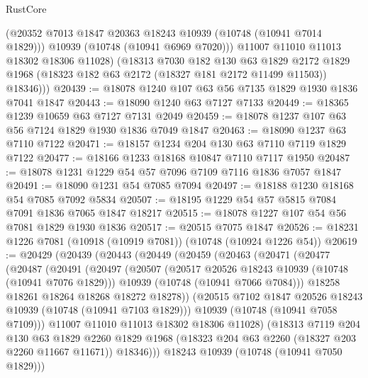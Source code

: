 \begin{lexlean}{RustCore}
\begin{coremodule}
            (@20352 @7013 @1847 @20363 @18243 @10939 (@10748 (@10941 @7014 @1829)))
            @10939
            (@10748 (@10941 @6969 @7020)))
          @11007
          @11010
          @11013
          @18302
          @18306
          @11028)
        (@18313
          @7030
          @182
          @130
          @63
          @1829
          @2172
          @1829
          @1968
          (@18323 @182 @63 @2172 (@18327 @181 @2172 @11499 @11503))
          @18346)))
@20439 := @18078 @1240 @107 @63 @56 @7135 @1829 @1930 @1836 @7041 @1847
@20443 := @18090 @1240 @63 @7127 @7133
@20449 := @18365 @1239 @10659 @63 @7127 @7131 @2049
@20459 := @18078 @1237 @107 @63 @56 @7124 @1829 @1930 @1836 @7049 @1847
@20463 := @18090 @1237 @63 @7110 @7122
@20471 := @18157 @1234 @204 @130 @63 @7110 @7119 @1829 @7122
@20477 := @18166 @1233 @18168 @10847 @7110 @7117 @1950
@20487 := @18078 @1231 @1229 @54 @57 @7096 @7109 @7116 @1836 @7057 @1847
@20491 := @18090 @1231 @54 @7085 @7094
@20497 := @18188 @1230 @18168 @54 @7085 @7092 @5834
@20507 := @18195 @1229 @54 @57 @5815 @7084 @7091 @1836 @7065 @1847 @18217
@20515 := @18078 @1227 @107 @54 @56 @7081 @1829 @1930 @1836
@20517 := @20515 @7075 @1847
@20526 := @18231 @1226 @7081 (@10918 (@10919 @7081)) (@10748 (@10924 @1226 @54))
@20619 := @20429
    (@20439
      (@20443
        (@20449
          (@20459
            (@20463
              (@20471
                (@20477
                  (@20487
                    (@20491
                      (@20497
                        (@20507
                          (@20517 @20526 @18243 @10939 (@10748 (@10941 @7076 @1829)))
                          @10939
                          (@10748 (@10941 @7066 @7084)))
                        @18258
                        @18261
                        @18264
                        @18268
                        @18272
                        @18278))
                    (@20515 @7102 @1847 @20526 @18243 @10939 (@10748 (@10941 @7103 @1829)))
                    @10939
                    (@10748 (@10941 @7058 @7109)))
                  @11007
                  @11010
                  @11013
                  @18302
                  @18306
                  @11028)
                (@18313
                  @7119
                  @204
                  @130
                  @63
                  @1829
                  @2260
                  @1829
                  @1968
                  (@18323 @204 @63 @2260 (@18327 @203 @2260 @11667 @11671))
                  @18346)))
            @18243
            @10939
            (@10748 (@10941 @7050 @1829)))

\end{coremodule}
\end{lexlean}
